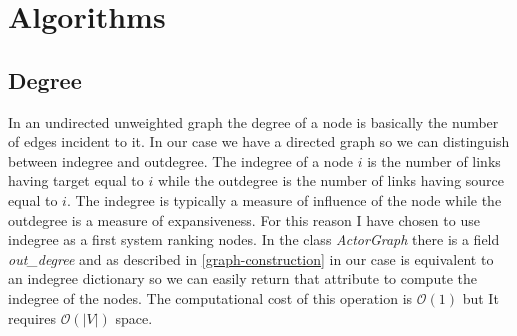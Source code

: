 \documentclass{article}
\begin{document}
\section{Algorithms}
\label{sec:algorithms}

\subsection{Degree}
\label{degree}
In an undirected unweighted graph the degree of a node is basically the number of edges incident to it. In our case we have a directed graph so we can distinguish between indegree and outdegree. The indegree of a node $i$ is the number of links having target equal to $i$ while the outdegree is the number of links having source equal to $i$. The indegree is typically a measure of influence of the node while the outdegree is a measure of expansiveness. For this reason I have chosen to use indegree as a first system ranking nodes. In the class \textit{ActorGraph} there is a field \textit{out\_degree} and as described in \ref{graph-construction} in our case is equivalent to an indegree dictionary so we can easily return that attribute to compute the indegree of the nodes. The computational cost of this operation is $\mathcal{O}(1)$ but It requires $\mathcal{O}(|V|)$ space.
\end{document}
